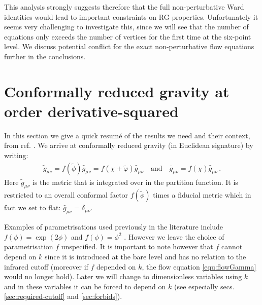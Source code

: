 \documentclass[11pt]{book} %
\numberwithin{equation}{chapter}
\begin{document}
This analysis strongly suggests therefore that the full non-perturbative Ward identities would lead
to important constraints on RG properties. Unfortunately it seems very challenging to investigate this,
since we will see that the number of equations only exceeds the number of vertices for the first time
at the six-point level.
We discuss potential conflict for the exact non-perturbative flow equations further in the conclusions.


\section{Conformally reduced gravity at order derivative-squared}
\label{sec:review}

In this section we give a quick resum\'e of the results we need and their context,
from ref. \cite{Dietz:2015owa}.
We arrive at conformally reduced gravity (in Euclidean signature) by writing:
\begin{align}
  \tilde g_{\mu\nu} = f(\tilde\phi) \hat g_{\mu\nu} = f(\chi +\tilde\varphi )\hat g_{\mu\nu}
  \quad \text{and} \quad
  \bar g_{\mu\nu} = f(\chi)\hat g_{\mu\nu} \,.
  \label{conformal-reduction}
\end{align}
Here $\tilde g_{\mu\nu}$ is the metric that is integrated over in the partition function.
It is restricted to an overall conformal factor $f(\tilde\phi)$ times a fiducial metric which
in fact we set to flat: $\hat g_{\mu\nu}=\delta_{\mu\nu}$.

Examples of parametrisations used previously in the literature include
$f(\phi) = \exp(2\phi)$ \cite{Machado:2009ph} and $f(\phi)=\phi^2$ \cite{Manrique:2009uh,Bonanno:2012dg}.
However we leave the choice of parametrisation $f$ unspecified.
It is important to note however that $f$ cannot depend on $k$ since it is introduced at the bare level
and has no relation to the infrared cutoff (moreover if $f$ depended on $k$,
the flow equation \eqref{equ:flowGamma} would no longer hold).
Later we will change to dimensionless variables using $k$ and in these variables it can be forced
to depend on $k$ (see especially secs. \ref{sec:required-cutoff} and \ref{sec:forbids}).
\end{document}
